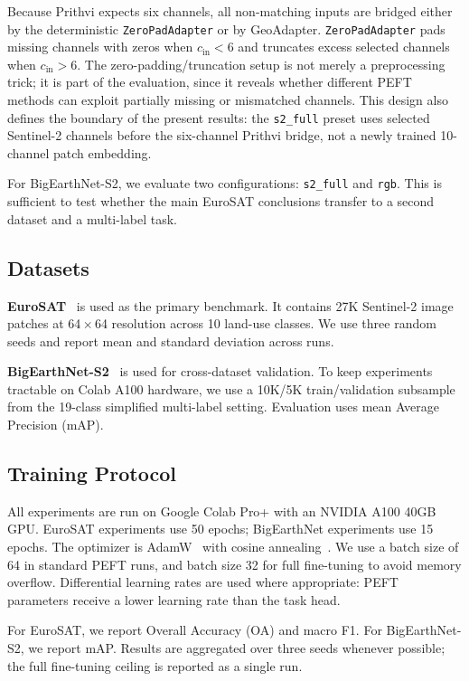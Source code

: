 \documentclass[11pt]{article}
\begin{document}
Because Prithvi expects six channels, all non-matching inputs are bridged either by the deterministic \texttt{ZeroPadAdapter} or by GeoAdapter. \texttt{ZeroPadAdapter} pads missing channels with zeros when $c_{\mathrm{in}}<6$ and truncates excess selected channels when $c_{\mathrm{in}}>6$. The zero-padding/truncation setup is not merely a preprocessing trick; it is part of the evaluation, since it reveals whether different PEFT methods can exploit partially missing or mismatched channels. This design also defines the boundary of the present results: the \texttt{s2\_full} preset uses selected Sentinel-2 channels before the six-channel Prithvi bridge, not a newly trained 10-channel patch embedding.

For BigEarthNet-S2, we evaluate two configurations: \texttt{s2\_full} and \texttt{rgb}. This is sufficient to test whether the main EuroSAT conclusions transfer to a second dataset and a multi-label task.

\subsection{Datasets}
\textbf{EuroSAT}~\cite{helber2019eurosat} is used as the primary benchmark. It contains 27K Sentinel-2 image patches at 64\,$\times$\,64 resolution across 10 land-use classes. We use three random seeds and report mean and standard deviation across runs.

\textbf{BigEarthNet-S2}~\cite{sumbul2019bigearthnet} is used for cross-dataset validation. To keep experiments tractable on Colab A100 hardware, we use a 10K/5K train/validation subsample from the 19-class simplified multi-label setting. Evaluation uses mean Average Precision (mAP).

\subsection{Training Protocol}
All experiments are run on Google Colab Pro+ with an NVIDIA A100 40GB GPU. EuroSAT experiments use 50 epochs; BigEarthNet experiments use 15 epochs. The optimizer is AdamW~\cite{loshchilov2019adamw} with cosine annealing~\cite{loshchilov2017sgdr}. We use a batch size of 64 in standard PEFT runs, and batch size 32 for full fine-tuning to avoid memory overflow. Differential learning rates are used where appropriate: PEFT parameters receive a lower learning rate than the task head.

For EuroSAT, we report Overall Accuracy (OA) and macro F1. For BigEarthNet-S2, we report mAP. Results are aggregated over three seeds whenever possible; the full fine-tuning ceiling is reported as a single run.
\end{document}

